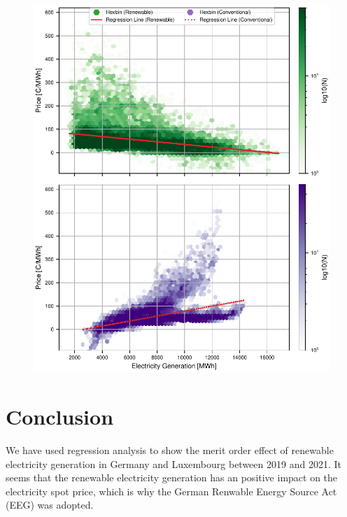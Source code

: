 \documentclass{article}
\begin{document}

\begin{figure}[h]
    \centering
    \includegraphics[width=\columnwidth]{doc/fig/ren_vs_con_regression_separate.pdf}
    \caption{}
    \label{fig:ren_vs_con_regression}
\end{figure}

\section{Conclusion}

We have used regression analysis to show the merit order effect of renewable electricity generation in Germany and Luxembourg between 2019 and 2021.
It seems that the renewable electricity generation has an positive impact on the electricity spot price, which is why the German Renwable Energy Source Act (EEG) was adopted. 



\end{document}
